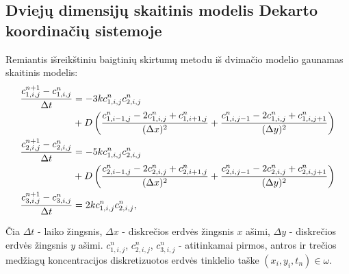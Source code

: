 \newpage
\subsection{Dviejų dimensijų skaitinis modelis Dekarto koordinačių sistemoje}

Remiantis išreikštiniu baigtinių skirtumų metodu iš dvimačio modelio gaunamas skaitinis modelis:
\begin{subequations} \label{numerical-eqs}
	\begin{align}
		\frac{c^{n+1}_{1,i,j}-c^n_{1,i,j}}{\Delta t} & =
		-3kc^{n}_{1,i,j}c^{n}_{2,i,j}\notag\\
        & +D\left(\frac{c^n_{1,i-1,j}-2c^n_{1,i,j}+c^n_{1,i+1,j}}{(\Delta x)^2}+\frac{c^n_{1,i,j-1}-2c^n_{1,i,j}+c^n_{1,i,j+1}}{(\Delta y)^2}\right) \\
		\frac{c^{n+1}_{2,i,j}-c^n_{2,i,j}}{\Delta t} & =
		-5kc^{n}_{1,i,j}c^{n}_{2,i,j}\notag\\
        &+D\left(\frac{c^n_{2,i-1,j}-2c^n_{2,i,j}+c^n_{2,i+1,j}}{(\Delta x)^2}+\frac{c^n_{2,i,j-1}-2c^n_{2,i,j}+c^n_{2,i,j+1}}{(\Delta y)^2}\right) \\
		\frac{c^{n+1}_{3,i,j}-c^n_{3,i,j}}{\Delta t} & =2kc^{n}_{1,i,j}c^{n}_{2,i,j},
	\end{align}
\end{subequations}

Čia
$\Delta t$ - laiko žingsnis,
$\Delta x$ - diskrečios erdvės žingsnis $x$ ašimi,
$\Delta y$ - diskrečios erdvės žingsnis $y$ ašimi.
$c^n_{1,i,j}$, $c^n_{2,i,j}$, $c^n_{3,i,j}$ - atitinkamai pirmos, antros ir trečios medžiagų koncentracijos diskretizuotos erdvės tinklelio taške $(x_i, y_i, t_n)\in\omega$.